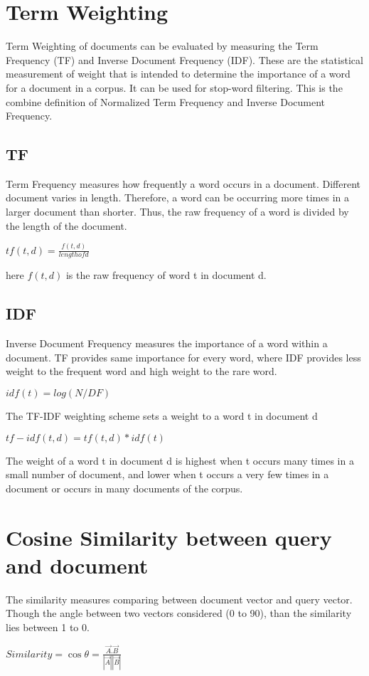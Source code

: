 \section{Term Weighting}

Term Weighting of documents can be evaluated by measuring the Term Frequency (TF) and Inverse Document Frequency (IDF). These are the statistical measurement of weight that is
intended to determine the importance of a word for a document in a corpus. It can be used for stop-word filtering. This is the combine definition of Normalized Term Frequency and Inverse Document Frequency.


\subsection{TF}

Term Frequency measures how frequently a word occurs in a document. Different document varies in length. Therefore, a word can be occurring more times in a larger document than shorter. Thus, the raw frequency of a word is divided by the length of the document.

\(tf(t,d) = \frac{f(t,d)}{length of d}\)

here $f(t,d)$ is the raw frequency of word t in document d.


\subsection{IDF}

Inverse Document Frequency measures the importance of a word within a document. TF provides same importance for every word, where IDF provides less weight to the frequent word and high weight to the rare word.

\(idf(t) = log(N/DF)\)

The TF-IDF weighting scheme sets a weight to a word t in document d

\(tf -idf(t ,d) = tf (t ,d) * idf(t)\)

The weight of a word t in document d is highest when t occurs many times in a small number of document, and lower when t occurs a very few times in a document or occurs in many documents of the corpus.


\section{Cosine Similarity between query and document}

The similarity measures comparing between document vector and query vector. Though the angle between two vectors considered (0 to 90), than the similarity lies between 1 to 0.

\(Similarity = \cos\theta = \frac{\overrightarrow{A}.\overrightarrow{B}}{|\overrightarrow{A}||\overrightarrow{B}|}\)


